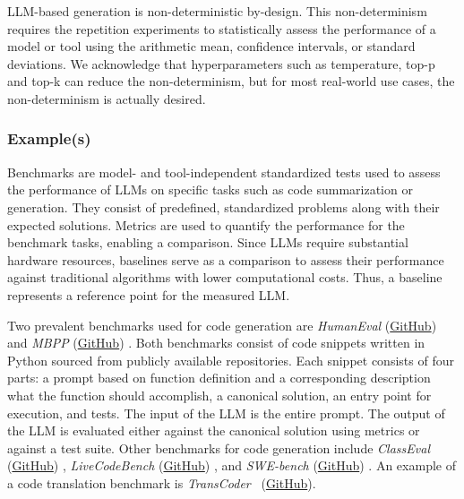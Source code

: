 LLM-based generation is non-deterministic by-design.
This non-determinism requires the repetition experiments to statistically assess the performance of a model or tool using the arithmetic mean, confidence intervals, or standard deviations.
We acknowledge that hyperparameters such as temperature, top-p and top-k can reduce the non-determinism, but for most real-world use cases, the non-determinism is actually desired.


\subsubsection{Example(s)}

Benchmarks are model- and tool-independent standardized tests used to assess the performance of LLMs on specific tasks such as code summarization or generation.
They consist of predefined, standardized problems along with their expected solutions.
Metrics are used to quantify the performance for the benchmark tasks, enabling a comparison.
Since LLMs require substantial hardware resources, baselines serve as a comparison to assess their performance against traditional algorithms with lower computational costs.
Thus, a baseline represents a reference point for the measured LLM.

Two prevalent benchmarks used for code generation are \emph{HumanEval} (\href{https://github.com/openai/human-eval}{GitHub}) \cite{DBLP:conf/acl/PapineniRWZ02} and \emph{MBPP} (\href{https://huggingface.co/datasets/google-research-datasets/mbpp}{GitHub}) \cite{DBLP:journals/corr/abs-2108-07732}.
Both benchmarks consist of code snippets written in Python sourced from publicly available repositories.
Each snippet consists of four parts: a prompt based on function definition and a corresponding description what the function should accomplish, a canonical solution, an entry point for execution, and tests.
The input of the LLM is the entire prompt.
The output of the LLM is evaluated either against the canonical solution using metrics or against a test suite.
Other benchmarks for code generation include \emph{ClassEval} (\href{https://github.com/openai/human-eval}{GitHub}) \cite{DBLP:journals/corr/abs-2308-01861}, \emph{LiveCodeBench} (\href{https://github.com/LiveCodeBench/LiveCodeBench}{GitHub}) \cite{DBLP:journals/corr/abs-2403-07974}, and \emph{SWE-bench} (\href{https://github.com/swe-bench/SWE-bench}{GitHub}) \cite{DBLP:conf/iclr/JimenezYWYPPN24}.
An example of a code translation benchmark is \emph{TransCoder}~\cite{DBLP:journals/corr/abs-2006-03511} (\href{https://github.com/facebookresearch/CodeGen}{GitHub}). 

